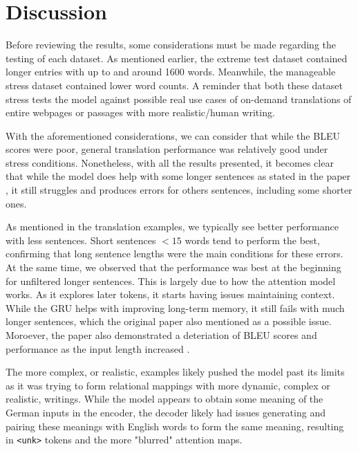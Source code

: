 \documentclass[11pt,a4paper]{article}
\begin{document}


\section{Discussion}
Before reviewing the results, some considerations must be made regarding the testing of each dataset. As mentioned earlier, the extreme test dataset contained longer entries with up to and around 1600 words. Meanwhile, the manageable stress dataset contained lower word counts. A reminder that both these dataset stress tests the model against possible real use cases of on-demand translations of entire webpages or passages with more realistic/human writing.

With the aforementioned considerations, we can consider that while the BLEU scores were poor, general translation performance was relatively good under stress conditions. Nonetheless, with all the results presented, it becomes clear that while the model does help with some longer sentences as stated in the paper \cite{bahdanau2016neural}, it still struggles and produces errors for others sentences, including some shorter ones. 

As mentioned in the translation examples, we typically see better performance with less sentences. Short sentences $<15$ words tend to perform the best, confirming that long sentence lengths were the main conditions for these errors. At the same time, we observed that the performance was best at the beginning for unfiltered longer sentences. This is largely due to how the attention model works. As it explores later tokens, it starts having issues maintaining context. While the GRU helps with improving long-term memory, it still fails with much longer sentences, which the original paper also mentioned as a possible issue. Moroever, the paper also demonstrated a deteriation of BLEU scores and performance as the input length increased \cite{bahdanau2016neural}.

The more complex, or realistic, examples likely pushed the model past its limits as it was trying to form relational mappings with more dynamic, complex or realistic, writings. While the model appears to obtain some meaning of the German inputs in the encoder, the decoder likely had issues generating and pairing these meanings with English words to form the same meaning, resulting in \verb|<unk>| tokens and the more "blurred" attention maps.
\end{document}
